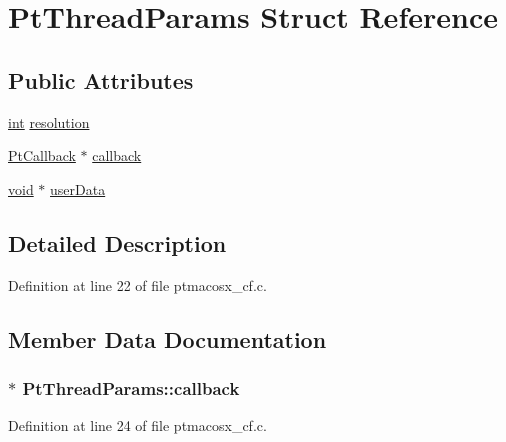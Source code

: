 \hypertarget{struct_pt_thread_params}{}\section{Pt\+Thread\+Params Struct Reference}
\label{struct_pt_thread_params}
\subsection*{Public Attributes}
\begin{DoxyCompactItemize}
\item 
\hyperlink{xmltok_8h_a5a0d4a5641ce434f1d23533f2b2e6653}{int} \hyperlink{struct_pt_thread_params_a774e27a8650e056ea0897bbdd9d7cc90}{resolution}
\item 
\hyperlink{porttime_8h_a41902497f5f1087f9ad9277a93166fd0}{Pt\+Callback} $\ast$ \hyperlink{struct_pt_thread_params_a739b9d08603ad3e13c27068d5908554d}{callback}
\item 
\hyperlink{sound_8c_ae35f5844602719cf66324f4de2a658b3}{void} $\ast$ \hyperlink{struct_pt_thread_params_ae3b2a829f0795f047aa19940a25f49e5}{user\+Data}
\end{DoxyCompactItemize}


\subsection{Detailed Description}


Definition at line 22 of file ptmacosx\+\_\+cf.\+c.



\subsection{Member Data Documentation}
\subsubsection[{\texorpdfstring{callback}{callback}}]{$\ast$ Pt\+Thread\+Params\+::callback}\hypertarget{struct_pt_thread_params_a739b9d08603ad3e13c27068d5908554d}{}\label{struct_pt_thread_params_a739b9d08603ad3e13c27068d5908554d}


Definition at line 24 of file ptmacosx\+\_\+cf.\+c.

